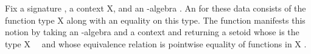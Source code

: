 Fix a signature , a context \ab X, and an -algebra .
An  for these data consists of the function type \ab X 
 along with an equality on this type.
The function  manifests this notion by taking an -algebra  and a
context  and returning a setoid whose  is the type
\ab X~~ and whose equivalence relation
is pointwise equality of functions in \ab X  .

\begin{code}%
\>[0]\<%
\\
\>[0]\AgdaSpace{}%
\AgdaSpace{}%
\AgdaSymbol{(}\AgdaSpace{}%
\AgdaSymbol{:}\AgdaSpace{}%
\AgdaSpace{}%
\AgdaSpace{}%
\AgdaSymbol{)}\AgdaSpace{}%
\<%
\\
\>[0][@{}l@{\AgdaIndent{0}}]%
\>[1]\AgdaSpace{}%
\AgdaSpace{}%
\AgdaOperator{\AgdaFunction{𝔻[}}\AgdaSpace{}%
\AgdaSpace{}%
\AgdaOperator{\AgdaFunction{]}}\AgdaSpace{}%
\AgdaSpace{}%
\AgdaSymbol{(}\AgdaSpace{}%
\AgdaSpace{}%
\AgdaSymbol{;}\AgdaSpace{}%
\AgdaSpace{}%
\AgdaSymbol{;}\AgdaSpace{}%
\AgdaSpace{}%
\AgdaSymbol{;}\AgdaSpace{}%
\AgdaSpace{}%
\AgdaSymbol{)}\<%
\\
%
\>[1]\AgdaSpace{}%
\AgdaSymbol{:}\AgdaSpace{}%
\AgdaSpace{}%
\AgdaSpace{}%
\AgdaSpace{}%
\AgdaSpace{}%
\AgdaSymbol{\AgdaUnderscore{}}\AgdaSpace{}%
\AgdaSymbol{\AgdaUnderscore{}}\<%
\\
%
\>[1]\AgdaSpace{}%
\AgdaSpace{}%
\AgdaSymbol{=}\AgdaSpace{}%
%
\>[17]\AgdaSymbol{\{}\AgdaSpace{}%
\AgdaSpace{}%
\AgdaSymbol{=}\AgdaSpace{}%
\AgdaSpace{}%
\AgdaSpace{}%
\AgdaOperator{\AgdaFunction{𝕌[}}\AgdaSpace{}%
\AgdaSpace{}%
\AgdaOperator{\AgdaFunction{]}}\<%
\\
%
\>[17]\AgdaSymbol{;}\AgdaSpace{}%
\AgdaSpace{}%
\AgdaSymbol{=}\AgdaSpace{}%
\AgdaSpace{}%
\AgdaSpace{}%
\AgdaSpace{}%
\AgdaSpace{}%
\AgdaSymbol{(}\AgdaSpace{}%
\AgdaSymbol{:}\AgdaSpace{}%

\end{code}
